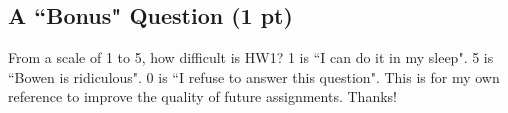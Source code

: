 \documentclass{assignment}
\begin{document}
\begin{problem}
\section{A ``Bonus" Question (1 pt)}
\noindent From a scale of 1 to 5, how difficult is HW1? 1 is ``I can do it in my sleep". 5 is ``Bowen is ridiculous". 0 is ``I refuse to answer this question". This is for my own reference to improve the quality of future assignments. Thanks!
    
\end{problem}
\end{document}
